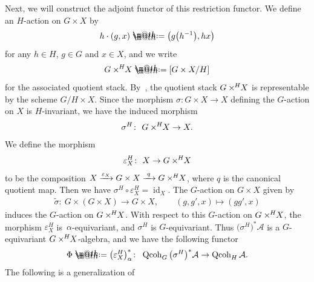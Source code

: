 \documentclass[pdftex]{sigma}%
\makeatletter
\newcommand*{\defeq}{\mathrel{\rlap{%
 \raisebox{0.3ex}{$\m@th\cdot$}}%
 \raisebox{-0.3ex}{$\m@th\cdot$}}%
 =}
\numberwithin{equation}{section}
\newcommand{\Qcoh}{\operatorname{Qcoh}}
\newcommand{\id}{\operatorname{id}}
\newcommand{\cA}{\mathcal{A}}
\newcommand{\timesH}{\times^{\hspace{-0.2mm}H\hspace{0.2mm}}\!\!}
\makeatother
\begin{document}
Next, we will construct the adjoint functor of this restriction functor. We define an $H$-action on $G\times X$ by
\begin{gather*}
h\cdot(g,x)\defeq\big(g\big(h^{-1}\big), h x\big)
\end{gather*}
for any $h\in H$, $g\in G$ and $x\in X$, and we write
\begin{gather*}
G\timesH X\defeq[G\times X/H]
\end{gather*}
for the associated quotient stack. By~\cite[Lemma~2.16(a)]{bfk}, the quotient stack $G\timesH X$ is representable by the scheme $G/H\times X$.
Since the morphism $\sigma\colon G\times X\to X$ defining the $G$-action on $X$ is $H$-invariant, we have the induced morphism
\begin{gather*}
\sigma^H\colon\ G\timesH X\to X.
\end{gather*}
We define the morphism
\begin{gather*}
\varepsilon_X^H\colon\ X\to G\timesH X
\end{gather*}
to be the composition $X\xrightarrow{\varepsilon_X}G\times X\xrightarrow{\,\,q\,\,}G\timesH X$,
where $q$ is the canonical quotient map. Then we have $\sigma^{H}\circ\varepsilon_X^H=\id_X$. The $G$-action on $G\times X$ given by
\begin{gather}\label{3b}
\widetilde{\sigma}\colon\ G\times (G\times X)\to G\times X,\qquad
(g,g',x)\mapsto (gg',x)
\end{gather}
induces the $G$-action on $G\timesH X$. With respect to this $G$-action on $G\timesH X$, the morphism $\varepsilon_X^H$ is~$\alpha$-equivariant, and $\sigma^H$ is $G$-equivariant. Thus $\big(\sigma^H\big)^*\cA$ is a $G$-equivariant $G\timesH X$-algebra, and we have the following functor
\begin{gather*}
\Phi\defeq\big(\varepsilon_X^H\big)^*_{\alpha}\colon\ \Qcoh _G\big(\sigma^H\big)^*\cA\to \Qcoh_H\cA.
\end{gather*}
The following is a generalization of~\cite[Lemma~2.13]{bfk}
\end{document}
